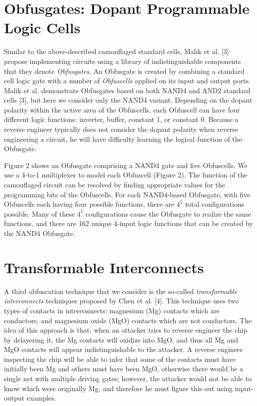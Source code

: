 \documentclass[proposal]{umassthesis}  %
\begin{document}
\section{Obfusgates: Dopant Programmable Logic Cells}
Similar to the above-described camouflaged standard cells, Malik et al. [3] propose implementing circuits using a library of indistinguishable components that they denote \textit{Obfusgates}. An Obfusgate is created by combining a standard cell logic gate with a number of \textit{Obfuscells} applied on its input and output ports. Malik et al. demonstrate Obfusgates based on both NAND4 and AND2 standard cells [3], but here we consider only the NAND4 variant. Depending on the dopant polarity within the active area of the Obfuscells, each Obfuscell can have four different logic functions: inverter, buffer, constant 1, or constant 0. Because a reverse engineer typically does not consider the dopant polarity when reverse engineering a circuit, he will have difficulty learning the logical function of the Obfusgate.

Figure 2 shows an Obfusgate comprising a NAND4 gate and five Obfuscells. We use a 4-to-1 multiplexer to model each Obfuscell (Figure 2). The function of the camouflaged circuit can be resolved by finding appropriate values for the programming bits of the Obfuscells. For each NAND4-based Obfusgate, with five Obfuscells each having four possible functions, there are $4^{5}$ total configurations possible. Many of these $4^{5}$ configurations cause the Obfusgate to realize the same functions, and there are 162 unique 4-input logic functions that can be created by the NAND4 Obfusgate.



















\section{Transformable Interconnects}

A third obfuscation technique that we consider is the so-called \textit{transformable interconnects} techniques proposed by Chen et al. [4]. This technique uses two types of contacts in interconnects: magnesium (Mg) contacts which are conductors, and magnesium oxide (MgO) contacts which are not conductors. The idea of this approach is that, when an attacker tries to reverse engineer the chip by delayering it, the Mg contacts will oxidize into MgO, and thus all Mg and MgO contacts will appear indistinguishable to the attacker. A reverse engineer inspecting the chip will be able to infer that some of the contacts must have initially been Mg and others must have been MgO, otherwise there would be a single net with multiple driving gates; however, the attacker would not be able to know which were originally Mg, and therefore he must figure this out using input-output examples.
\end{document}
